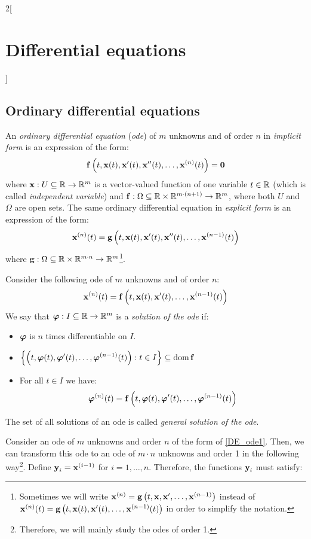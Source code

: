 \documentclass[../../../main.tex]{subfiles}
\begin{document}
\begin{multicols}{2}[\section{Differential equations}]
  \subsection{Ordinary differential equations}
  \begin{definition}
    An \emph{ordinary differential equation} (\emph{ode}) of $m$ unknowns and of order $n$ in \emph{implicit form} is an expression of the form: $$\boldsymbol{\mathrm{f}}\left(t,\boldsymbol{\mathrm{x}}(t),\boldsymbol{\mathrm{x}}'(t),\boldsymbol{\mathrm{x}}''(t),\ldots,\boldsymbol{\mathrm{x}}^{(n)}(t)\right)=\boldsymbol{\mathrm{0}}$$
    where $\boldsymbol{\mathrm{x}}:U\subseteq\mathbb{R}\rightarrow\mathbb{R}^m$ is a vector-valued function of one variable $t\in\mathbb{R}$ (which is called \emph{independent variable}) and $\boldsymbol{\mathrm{f}}:\Omega\subseteq\mathbb{R}\times\mathbb{R}^{m\cdot(n+1)}\rightarrow\mathbb{R}^m$, where both $U$ and $\Omega$ are open sets. The same ordinary differential equation in \emph{explicit form} is an expression of the form: $$\boldsymbol{\mathrm{x}}^{(n)}(t)=\boldsymbol{\mathrm{g}}\left(t,\boldsymbol{\mathrm{x}}(t),\boldsymbol{\mathrm{x}}'(t),\boldsymbol{\mathrm{x}}''(t),\ldots,\boldsymbol{\mathrm{x}}^{(n-1)}(t)\right)$$
    where $\boldsymbol{\mathrm{g}}:\Omega\subseteq\mathbb{R}\times\mathbb{R}^{m\cdot n}\rightarrow\mathbb{R}^m$\footnote{Sometimes we will write $\boldsymbol{\mathrm{x}}^{(n)}=\boldsymbol{\mathrm{g}}\left(t,\boldsymbol{\mathrm{x}},\boldsymbol{\mathrm{x}}',\ldots,\boldsymbol{\mathrm{x}}^{(n-1)}\right)$ instead of $\boldsymbol{\mathrm{x}}^{(n)}(t)=\boldsymbol{\mathrm{g}}\left(t,\boldsymbol{\mathrm{x}}(t),\boldsymbol{\mathrm{x}}'(t),\ldots,\boldsymbol{\mathrm{x}}^{(n-1)}(t)\right)$ in order to simplify the notation.}.
  \end{definition}
  \begin{definition}
    Consider the following ode of $m$ unknowns and of order $n$:
    \begin{equation}\label{DE_ode1}
      \boldsymbol{\mathrm{x}}^{(n)}(t)=\boldsymbol{\mathrm{f}}\left(t,\boldsymbol{\mathrm{x}}(t),\boldsymbol{\mathrm{x}}'(t),\ldots,\boldsymbol{\mathrm{x}}^{(n-1)}(t)\right)
    \end{equation}
    We say that $\boldsymbol{\mathrm{\varphi}}:I\subseteq\mathbb{R}\rightarrow\mathbb{R}^m$ is a \emph{solution of the ode} if:
    \begin{itemize}
      \item $\boldsymbol{\mathrm{\varphi}}$ is $n$ times differentiable on $I$.
      \item $\displaystyle\left\{\left(t,\boldsymbol{\mathrm{\varphi}}(t),\boldsymbol{\mathrm{\varphi}}'(t),\ldots,\boldsymbol{\mathrm{\varphi}}^{(n-1)}(t)\right):t\in I\right\}\subseteq\operatorname{dom} \boldsymbol{\mathrm{f}}$
      \item For all $t\in I$ we have:
            $$\boldsymbol{\mathrm{\varphi}}^{(n)}(t)=\boldsymbol{\mathrm{f}}\left(t,\boldsymbol{\mathrm{\varphi}}(t),\boldsymbol{\mathrm{\varphi}}'(t),\ldots,\boldsymbol{\mathrm{\varphi}}^{(n-1)}(t)\right)$$
    \end{itemize}
    The set of all solutions of an ode is called \emph{general solution of the ode}.
  \end{definition}
  \begin{proposition}
    Consider an ode of $m$ unknowns and order $n$ of the form of \cref{DE_ode1}. Then, we can transform this ode to an ode of $m\cdot n$ unknowns and order 1 in the following way\footnote{Therefore, we will mainly study the odes of order 1.}. Define $\boldsymbol{\mathrm{y}}_i=\boldsymbol{\mathrm{x}}^{(i-1)}$ for $i=1,\ldots,n$. Therefore, the functions $\boldsymbol{\mathrm{y}}_i$ must satisfy:

\end{proposition}
\end{multicols}
\end{document}
